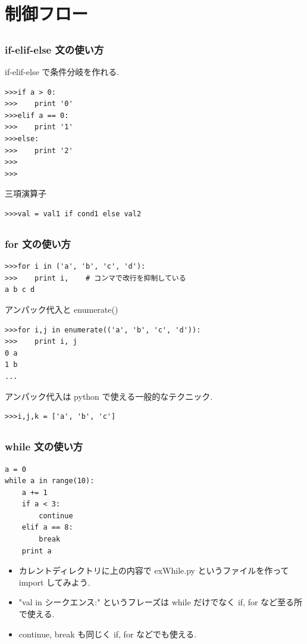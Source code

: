 \section{制御フロー}

\subsection*{\redm\whitem\greenb}
\begin{frame}[t,fragile]
\frametitle{if-elif-else 文の使い方}
if-elif-else で条件分岐を作れる. 
\begin{lstlisting}[stepnumber=1]
>>>if a > 0:
>>>    print '0'
>>>elif a == 0:
>>>    print '1'
>>>else:
>>>    print '2'
>>>
>>>
\end{lstlisting}

三項演算子

\begin{lstlisting}
>>>val = val1 if cond1 else val2
\end{lstlisting}
\end{frame}

\subsection*{\redm\whitem\greenb}
\begin{frame}[t,fragile]
\frametitle{for 文の使い方}
\begin{lstlisting}
>>>for i in ('a', 'b', 'c', 'd'):
>>>    print i,    # コンマで改行を抑制している
a b c d
\end{lstlisting}

アンパック代入と enumerate()
\begin{lstlisting}
>>>for i,j in enumerate(('a', 'b', 'c', 'd')):
>>>    print i, j
0 a
1 b
...
\end{lstlisting}
アンパック代入は python で使える一般的なテクニック. 
\begin{lstlisting}
>>>i,j,k = ['a', 'b', 'c']
\end{lstlisting}
\end{frame}

\subsection*{\redm\whitem\greenb}
\begin{frame}[t,fragile]
\frametitle{while 文の使い方}
\begin{lstlisting}
a = 0
while a in range(10):
    a += 1
    if a < 3:
        continue
    elif a == 8:
        break
    print a

\end{lstlisting}

\begin{itemize}
\item カレントディレクトリに上の内容で exWhile.py というファイルを作って import してみよう.
\item "val in シークエンス:" というフレーズは while だけでなく if, for など至る所で使える.
\item continue, break も同じく if, for などでも使える.
\end{itemize}
\end{frame}

